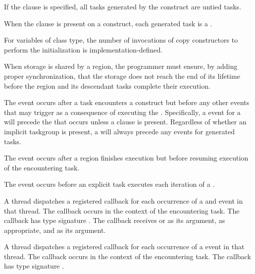If the  clause is specified, all tasks generated by the 
 construct are untied tasks.

When the  clause is present on a  construct, 
each generated task is a .

\begin{cppspecific}
For  variables of class type, the number of invocations 
of copy constructors to perform the initialization  is implementation-defined.
\end{cppspecific}

\begin{note}
When storage is shared by a  region, the programmer must ensure, 
by adding proper synchronization, that the storage does not reach the end of 
its lifetime before the  region and its descendant tasks 
complete their execution.
\end{note}

\events

The  event occurs after a task encounters a
 construct but before any other events that may
trigger as a consequence of executing the .
Specifically, a  event for a 
will precede the  that occurs unless a
 clause is present.  Regardless of whether an implicit
taskgroup is present, a  will always precede
any  events for generated tasks.

The  event occurs after a  region 
finishes execution but before resuming execution of the encountering task.

The  event occurs before an explicit
task executes each iteration of a .

\tools

A thread dispatches a registered 
callback for each occurrence of a  and
 event in that thread. The callback occurs in the
context of the encountering task.  The callback has type signature
. The callback receives
 or 
as its  argument, as appropriate, and
 as its  argument.

A thread dispatches a registered 
callback for each occurrence of a  
event in that thread. The callback occurs in the
context of the encountering task.  The callback has type signature
. 

